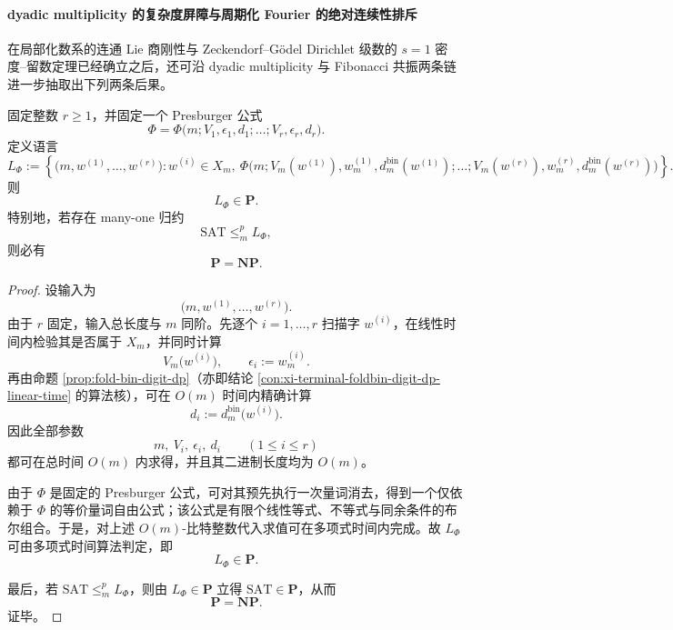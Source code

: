 \paragraph{dyadic multiplicity 的复杂度屏障与周期化 Fourier 的绝对连续性排斥}
在局部化数系的连通 Lie 商刚性与 Zeckendorf--Gödel Dirichlet 级数的 \(s=1\) 密度--留数定理已经确立之后，还可沿 dyadic multiplicity 与 Fibonacci 共振两条链进一步抽取出下列两条后果。

\begin{theorem}\label{thm:xi-fixed-arity-dyadic-multiplicity-presburger-in-p}
固定整数 \(r\ge 1\)，并固定一个 Presburger 公式
\[
\Phi=\Phi\bigl(m;V_1,\epsilon_1,d_1;\dots;V_r,\epsilon_r,d_r\bigr).
\]
定义语言
\[
L_\Phi
:=
\left\{
\bigl(m,w^{(1)},\dots,w^{(r)}\bigr):
w^{(i)}\in X_m,\ 
\Phi\!\bigl(m;V_m(w^{(1)}),w_m^{(1)},d_m^{\mathrm{bin}}(w^{(1)});\dots;V_m(w^{(r)}),w_m^{(r)},d_m^{\mathrm{bin}}(w^{(r)})\bigr)
\right\}.
\]
则
\[
L_\Phi\in \mathbf P.
\]
特别地，若存在 many-one 归约
\[
\mathrm{SAT}\le_m^p L_\Phi,
\]
则必有
\[
\mathbf P=\mathbf{NP}.
\]
\end{theorem}
\begin{proof}
设输入为
\[
\bigl(m,w^{(1)},\dots,w^{(r)}\bigr).
\]
由于 \(r\) 固定，输入总长度与 \(m\) 同阶。先逐个 \(i=1,\dots,r\) 扫描字 \(w^{(i)}\)，在线性时间内检验其是否属于 \(X_m\)，并同时计算
\[
V_m\bigl(w^{(i)}\bigr),
\qquad
\epsilon_i:=w_m^{(i)}.
\]
再由命题 \ref{prop:fold-bin-digit-dp}（亦即结论 \ref{con:xi-terminal-foldbin-digit-dp-linear-time} 的算法核），可在 \(O(m)\) 时间内精确计算
\[
d_i:=d_m^{\mathrm{bin}}\bigl(w^{(i)}\bigr).
\]
因此全部参数
\[
m,\ V_i,\ \epsilon_i,\ d_i
\qquad(1\le i\le r)
\]
都可在总时间 \(O(m)\) 内求得，并且其二进制长度均为 \(O(m)\)。

由于 \(\Phi\) 是固定的 Presburger 公式，可对其预先执行一次量词消去，得到一个仅依赖于 \(\Phi\) 的等价量词自由公式；该公式是有限个线性等式、不等式与同余条件的布尔组合。于是，对上述 \(O(m)\)-比特整数代入求值可在多项式时间内完成。故 \(L_\Phi\) 可由多项式时间算法判定，即
\[
L_\Phi\in\mathbf P.
\]

最后，若 \(\mathrm{SAT}\le_m^p L_\Phi\)，则由 \(L_\Phi\in \mathbf P\) 立得 \(\mathrm{SAT}\in \mathbf P\)，从而
\[
\mathbf P=\mathbf{NP}.
\]
证毕。
\end{proof}

